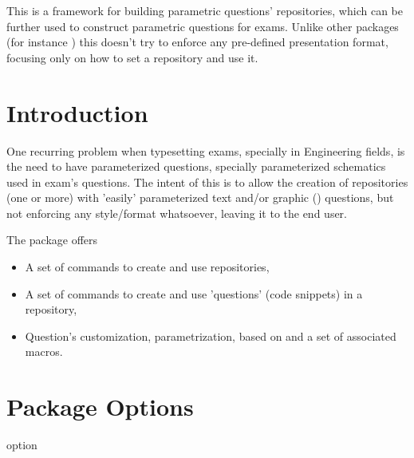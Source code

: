 \documentclass[10pt]{article}
\begin{document}
  
\begin{typesetabstract}

This is a framework for building parametric questions' repositories, which can be further used to construct parametric questions for exams. Unlike other packages (for instance ) this doesn't try to enforce any pre-defined presentation format, focusing only on how to set a repository and use it.
\end{typesetabstract}

\tableofcontents

\section{Introduction}
One recurring problem when typesetting exams, specially in Engineering fields, is the need to have parameterized questions, specially parameterized schematics used in exam's questions. The intent of this is to allow the creation of repositories (one or more) with 'easily' parameterized text and/or graphic () questions, but not enforcing any style/format whatsoever, leaving it to the end user.

The package offers
\begin{itemize}
  \item A set of commands to create and use repositories,
  \item A set of commands to create and use 'questions' (code snippets) in a repository,
  \item Question's customization, parametrization, based on  and a set of associated macros.
\end{itemize}

\section{Package Options}\label{package options}
\begin{describelist}{option}
\end{describelist}
\end{document}
